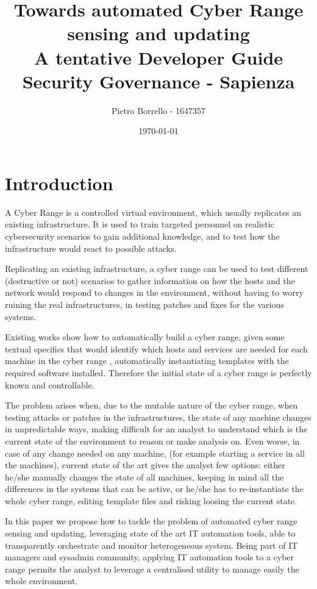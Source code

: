 \documentclass[11pt]{article}
\title{Towards automated Cyber Range sensing and updating \\ {\large A tentative Developer Guide} \\ \bigskip Security Governance - Sapienza}
\author{Pietro Borrello - 1647357}
\date{\today}
\begin{document}
\maketitle

\tableofcontents
\newpage

\section{Introduction}
A Cyber Range is a controlled virtual environment, which usually replicates an existing infrastructure. It is used to train targeted personnel on realistic cybersecurity scenarios to gain additional knowledge, and to test how the infrastructure would react to possible attacks. 

Replicating an existing infrastructure, a cyber range can be used to test different (destructive or not) scenarios to gather information on how the hosts and the network would respond to changes in the environment, without having to worry ruining the real infrastructures, in testing patches and fixes for the various systems. 

Existing works show how to automatically build a cyber range, given some textual specifics that would identify which hosts and services are needed for each machine in the cyber range \cite{cyris}, automatically instantiating templates with the required software installed. Therefore the initial state of a cyber range is perfectly known and controllable. 

The problem arises when, due to the mutable nature of the cyber range, when testing attacks or patches in the infrastructures, the state of any machine changes in unpredictable ways, making difficult for an analyst to understand which is the current state of the environment to reason or make analysis on. Even worse, in case of any change needed on any machine, (for example starting a service in all the machines), current state of the art gives the analyst few options: either he/she manually changes the state of all machines, keeping in mind all the differences in the systems that can be active, or he/she has to re-instantiate the whole cyber range, editing template files and risking loosing the current state.

In this paper we propose how to tackle the problem of automated cyber range sensing and updating, leveraging state of the art IT automation tools, able to transparently orchestrate and monitor heterogeneous system. Being part of IT managers and sysadmin community, applying IT automation tools to a cyber range permits the analyst to leverage a centralised utility to manage easily the whole environment. 
\end{document}
